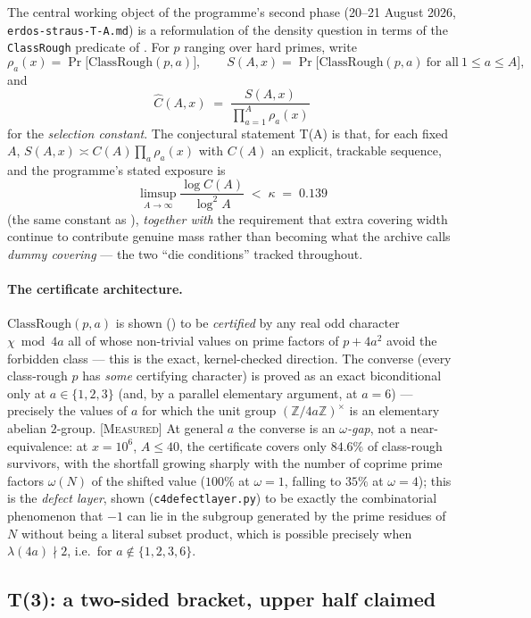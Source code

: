 \documentclass[11pt]{article}
\theoremstyle{plain}
\theoremstyle{definition}
\theoremstyle{remark}
\newcommand{\MEASURED}{\textcolor{claimed}{\textsc{[Measured]}}}
\newcommand{\file}[1]{\texttt{#1}}
\newcommand{\lean}[1]{\texttt{#1}}
\renewcommand{\_}{\textunderscore\allowbreak}
\newcommand{\Z}{\mathbb{Z}}
\begin{document}
The central working object of the programme's second phase (20--21 August 2026,
\file{erdos-straus-T-A.md}) is a reformulation of the density question in terms of the
\lean{ClassRough} predicate of . For $p$ ranging over hard primes,
write
\[
\rho_a(x) = \Pr\bigl[\mathrm{ClassRough}(p,a)\bigr], \qquad
S(A,x) = \Pr\bigl[\mathrm{ClassRough}(p,a)\ \text{for all}\ 1\le a\le A\bigr],
\]
and
\[
\widehat C(A,x) \;=\; \frac{S(A,x)}{\prod_{a=1}^A \rho_a(x)}
\]
for the \emph{selection constant}. The conjectural statement T(A) is that, for each fixed $A$,
$S(A,x)\asymp C(A)\prod_a\rho_a(x)$ with $C(A)$ an explicit, trackable sequence, and the
programme's stated exposure is
\[
\limsup_{A\to\infty} \frac{\log C(A)}{\log^2 A} \;<\; \kappa \;=\; 0.139
\]
(the same constant as ), \emph{together with} the requirement that extra
covering width continue to contribute genuine mass rather than becoming what the archive calls
\emph{dummy covering} — the two ``die conditions'' tracked throughout.

\paragraph{The certificate architecture.} $\mathrm{ClassRough}(p,a)$ is shown ()
to be \emph{certified} by any real odd character $\chi\bmod 4a$ all of whose non-trivial values
on prime factors of $p+4a^2$ avoid the forbidden class — this is the exact, kernel-checked
direction. The converse (every class-rough $p$ has \emph{some} certifying character) is proved
as an exact biconditional only at $a\in\{1,2,3\}$ (and, by a parallel elementary argument, at
$a=6$) — precisely the values of $a$ for which the unit group $(\Z/4a\Z)^\times$ is an
elementary abelian $2$-group. \MEASURED{} At general $a$ the converse is an \emph{$\omega$-gap},
not a near-equivalence: at $x=10^6$, $A\le40$, the certificate covers only $84.6\%$ of
class-rough survivors, with the shortfall growing sharply with the number of coprime prime
factors $\omega(N)$ of the shifted value ($100\%$ at $\omega=1$, falling to $35\%$ at
$\omega=4$); this is the \emph{defect layer}, shown (\file{c4\_defect\_layer.py}) to be exactly
the combinatorial phenomenon that $-1$ can lie in the subgroup generated by the prime residues
of $N$ without being a literal subset product, which is possible precisely when
$\lambda(4a)\nmid 2$, i.e.\ for $a\notin\{1,2,3,6\}$.

\subsection{T(3): a two-sided bracket, upper half claimed}
\label{subsec:t3}
\end{document}

